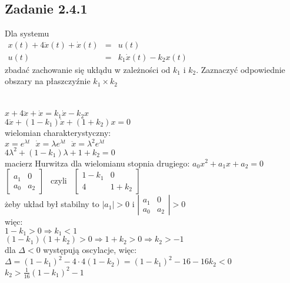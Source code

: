 \subsection*{Zadanie 2.4.1} {\color{darkgray}
	Dla systemu\\
	$\begin{array}{rcl}x(t)+4\ddot{x}(t)+\dot{x}(t)&=&u(t) \\ u(t)&=&k_1\dot{x}(t)-k_2x(t)\end{array}$\\
	zbadać zachowanie się ukłądu w zależności od $k_1$ i $k_2$. Zaznaczyć odpowiednie obszary na płaszczyźnie $k_1 \times k_2$\\
}\lineh
\\\\
$x+4\ddot{x}+\dot{x}=k_1\dot{x}-k_2x$\\
$4\ddot{x}+(1-k_1)\dot{x}+(1+k_2)x=0$\\
wielomian charakterystyczny:\\
$x=e^{\lambda t} \ \ \ \dot{x}=\lambda e^{\lambda t} \ \ \ \ddot{x}=\lambda^2 e^{\lambda t}$\\
$4\lambda^2+(1-k_1)\lambda+1+k_2=0$\\
macierz Hurwitza dla wielomianu stopnia drugiego:
$a_0x^2+a_1x+a_2=0$\\
$\left[\begin{array}{cc}a_1&0\\a_0&a_2\end{array}\right] \ \ $ czyli $\ \ 
\left[\begin{array}{cc}1-k_1&0\\4&1+k_2\end{array}\right]$\\
żeby układ był stabilny to $|a_1|>0$ i $\left|\begin{array}{cc}a_1&0\\a_0&a_2\end{array}\right|>0$\\
więc:\\
$1-k_1>0 \Rightarrow\boxed{ k_1<1}$\\
$(1-k_1)(1+k_2)>0 \Rightarrow 1+k_2>0 \Rightarrow \boxed{k_2>-1}$\\
dla $\Delta<0$ występują oscylacje, więc:\\
$\Delta=(1-k_1)^2-4\cdot4(1-k_2)=(1-k_1)^2-16-16k_2<0$\\
$k_2>\frac{1}{16}(1-k_1)^2-1$\\
